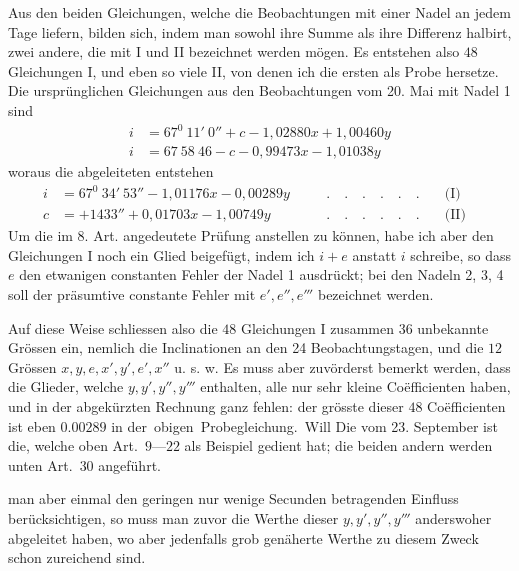 Aus den beiden Gleichungen, welche die Beobachtungen mit einer Nadel an jedem Tage liefern, bilden sich, indem man sowohl ihre Summe als ihre Differenz halbirt, zwei andere, die mit I und II bezeichnet werden mögen. Es entstehen also $48$ Gleichungen I, und eben so viele II, von denen ich die ersten als Probe hersetze. Die ursprünglichen Gleichungen aus den Beobachtungen vom 20. Mai mit Nadel 1 sind
\[
\begin{aligned}
i&=67^0\ 11'\ 0''+c-1{,}02880x+1{,}00460y\\
i&=67\ 58\ 46-c-0{,}99473x-1{,}01038y
\end{aligned}
\]
woraus die abgeleiteten entstehen
\[
\begin{alignedat}{3}
i&=67^0\ 34'\ 53''-1{,}01176x-0{,}00289y
  &&\quad.\quad.\quad.\quad.\quad.\quad. &\quad\text{(I)}&\\
c&=+1433''+0{,}01703x-1{,}00749y
  &&\quad.\quad.\quad.\quad.\quad.\quad. &\quad\text{(II)}&
\end{alignedat}
\]
Um die im 8. Art. angedeutete Prüfung anstellen zu können, habe ich aber den Gleichungen I noch ein Glied beigefügt, indem ich $i+e$ anstatt $i$ schreibe, so dass $e$ den etwanigen constanten Fehler der Nadel 1 ausdrückt; bei den Nadeln 2, 3, 4 soll der präsumtive constante Fehler mit $e',e'',e'''$ bezeichnet werden.

Auf diese Weise schliessen also die $48$ Gleichungen I zusammen $36$ unbekannte Grössen ein, nemlich die Inclinationen an den 24 Beobachtungstagen, und die $12$ Grössen $x,y,e,x',y',e',x''$ u. s. w. Es muss aber zuvörderst bemerkt werden, dass die Glieder, welche $y,y',y'',y'''$ enthalten, alle nur sehr kleine Coëfficienten haben, und in der abgekürzten Rechnung ganz fehlen: der grösste dieser $48$ Coëfficienten ist eben $0.00289$ in \mbox{der obigen Probegleichung. Will}
\expandafter\def\csname HistoricalNoteText486\endcsname{Die vom 23. September ist die, welche oben Art.\ $9$—$22$ als Beispiel gedient hat; die beiden andern werden unten Art.\ $30$ angeführt.}
\par\clearpage
{}
\noindent man aber einmal den geringen nur wenige Secunden betragenden Einfluss berücksichtigen, so muss man zuvor die Werthe dieser $y,y',y'',y'''$ anderswoher abgeleitet haben, wo aber jedenfalls grob genäherte Werthe zu diesem Zweck schon zureichend sind.

